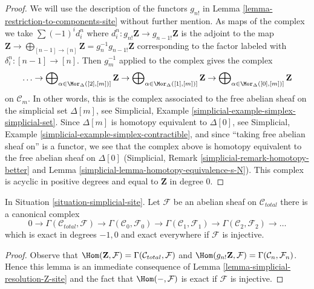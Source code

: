 \begin{proof}
We will use the description of the functors $g_{n!}$ in
Lemma \ref{lemma-restriction-to-components-site} without further mention.
As maps of the complex we take $\sum (-1)^i d^n_i$ where
$d^n_i : g_{n!}\mathbf{Z} \to g_{n - 1!}\mathbf{Z}$ is the
adjoint to the map $\mathbf{Z} \to
\bigoplus_{[n - 1] \to [n]} \mathbf{Z} = g_n^{-1}g_{n - 1!}\mathbf{Z}$
corresponding to the factor labeled with $\delta^n_i : [n - 1] \to [n]$.
Then $g_m^{-1}$ applied to the complex gives the complex
$$
\ldots \to
\bigoplus\nolimits_{\alpha \in \Mor_\Delta([2], [m])]} \mathbf{Z} \to
\bigoplus\nolimits_{\alpha \in \Mor_\Delta([1], [m])]} \mathbf{Z} \to
\bigoplus\nolimits_{\alpha \in \Mor_\Delta([0], [m])]} \mathbf{Z}
$$
on $\mathcal{C}_m$.
In other words, this is the complex associated to the
free abelian sheaf on the simplicial set $\Delta[m]$, see
Simplicial, Example \ref{simplicial-example-simplex-simplicial-set}.
Since $\Delta[m]$ is homotopy equivalent to $\Delta[0]$, see
Simplicial, Example \ref{simplicial-example-simplex-contractible},
and since ``taking free abelian sheaf on'' is a functor,
we see that the complex above is homotopy equivalent to
the free abelian sheaf on $\Delta[0]$
(Simplicial, Remark \ref{simplicial-remark-homotopy-better} and
Lemma \ref{simplicial-lemma-homotopy-equivalence-s-N}).
This complex is acyclic in positive degrees
and equal to $\mathbf{Z}$ in degree $0$.
\end{proof}

\begin{lemma}
\label{lemma-cech-complex}
In Situation \ref{situation-simplicial-site}. Let $\mathcal{F}$ be an abelian
sheaf on $\mathcal{C}_{total}$ there is a canonical complex
$$
0 \to \Gamma(\mathcal{C}_{total}, \mathcal{F}) \to
\Gamma(\mathcal{C}_0, \mathcal{F}_0) \to
\Gamma(\mathcal{C}_1, \mathcal{F}_1) \to
\Gamma(\mathcal{C}_2, \mathcal{F}_2) \to \ldots
$$
which is exact in degrees $-1, 0$ and exact everywhere
if $\mathcal{F}$ is injective.
\end{lemma}

\begin{proof}
Observe that
$\Hom(\mathbf{Z}, \mathcal{F}) = \Gamma(\mathcal{C}_{total}, \mathcal{F})$
and
$\Hom(g_{n!}\mathbf{Z}, \mathcal{F}) = \Gamma(\mathcal{C}_n, \mathcal{F}_n)$.
Hence this lemma is an immediate consequence of
Lemma \ref{lemma-simplicial-resolution-Z-site}
and the fact that $\Hom(-, \mathcal{F})$ is exact if
$\mathcal{F}$ is injective.
\end{proof}

